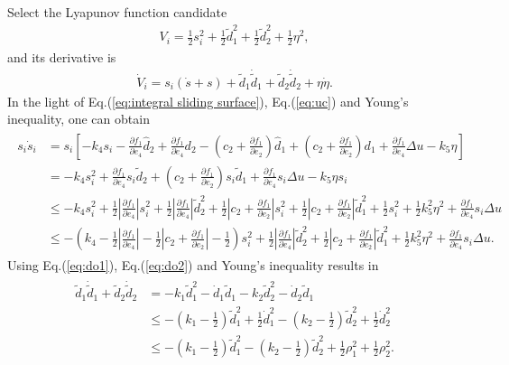 \documentclass[ShortAfour]{sage}
\theoremstyle{plain}
\theoremstyle{remark}
\begin{document}
Select the Lyapunov function candidate
\begin{align}
  V_i = \frac{1}{2}s_i^2+\frac{1}{2}\tilde d_1^2+\frac{1}{2}\tilde d_2^2+\frac{1}{2}\eta^2,\label{eq:v}
\end{align}
and its derivative is
\begin{align}
  \dot V_i = s_i(\dot s+s)+\tilde d_1\dot{\tilde d}_1 +\tilde d_2\dot{\tilde d}_2+\eta\dot\eta\label{eq:dv}.
\end{align}
In the light of Eq.(\ref{eq:integral sliding surface}), Eq.(\ref{eq:uc}) and Young's inequality, one can obtain
  \begin{align}\begin{split}
    s_i\dot s_i&=s_i\left[-k_4s_i-\frac{\partial f_1}{\partial e_4}\hat d_2+\frac{\partial f_1}{\partial e_4}d_2-\left(c_2+\frac{\partial f_1}{\partial e_2}\right)\hat d_1+\left(c_2+\frac{\partial f_1}{\partial e_2}\right)d_1+\frac{\partial f_1}{\partial e_4}\Delta u-k_5\eta\right]\\
    &=-k_4s_i^2+\frac{\partial f_1}{\partial e_4}s_i\tilde d_2 +\left(c_2+\frac{\partial f_1}{\partial e_2}\right)s_i\tilde d_1+\frac{\partial f_1}{\partial e_4}s_i\Delta u-k_5\eta s_i\\
    &\le -k_4s_i^2+\frac{1}{2}\left\vert\frac{\partial f_1}{\partial e_4}\right\vert s_i^2+\frac{1}{2}\left\vert\frac{\partial f_1}{\partial e_4}\right\vert \tilde d_2^2+\frac{1}{2}\left\vert c_2+\frac{\partial f_1}{\partial e_2}\right\vert s_i^2+\frac{1}{2}\left\vert c_2+\frac{\partial f_1}{\partial e_2}\right\vert \tilde d_1^2+\frac{1}{2}s_i^2+\frac{1}{2}k_5^2\eta^2+\frac{\partial f_1}{\partial e_4}s_i\Delta u\\
    &\le -\left(k_4-\frac{1}{2}\left\vert\frac{\partial f_1}{\partial e_4}\right\vert-\frac{1}{2}\left\vert c_2+\frac{\partial f_1}{\partial e_2}\right\vert-\frac{1}{2}\right)s_i^2+\frac{1}{2}\left\vert\frac{\partial f_1}{\partial e_4}\right\vert\tilde d_2^2+\frac{1}{2}\left\vert c_2+\frac{\partial f_1}{\partial e_2}\right\vert\tilde d_1^2+\frac{1}{2}k_5^2\eta^2+\frac{\partial f_1}{\partial e_4}s_i\Delta u.\label{eq:sds}
  \end{split}\end{align}
Using Eq.(\ref{eq:do1}), Eq.(\ref{eq:do2}) and Young's inequality results in
\begin{align}\begin{split}
  \tilde d_1\dot {\tilde d}_1+\tilde d_2\dot {\tilde d}_2&=-k_1\tilde{d}_1^2- \dot d_1\tilde{d}_1-k_2\tilde{d}_2^2- \dot d_2\tilde{d}_1\\
  &\le-\left(k_1-\frac{1}{2}\right)\tilde{d}_1^2+ \frac{1}{2}\dot d_1^2-\left(k_2-\frac{1}{2}\right)\tilde{d}_2^2+ \frac{1}{2}\dot d_2^2\\
  &\le-\left(k_1-\frac{1}{2}\right)\tilde{d}_1^2-\left(k_2-\frac{1}{2}\right)\tilde{d}_2^2+ \frac{1}{2}\rho_1^2+ \frac{1}{2} \rho_2^2.\label{eq:d1d1+d2d2}
\end{split}\end{align}
\end{document}
